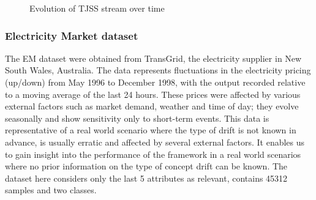 \documentclass[conference]{IEEEtran}
\begin{document}
\begin{figure}
\begin{center}
  \end{center}
  \caption{Evolution of TJSS stream over time}
\label{fig:syntheticstream} 
\end{figure}

\subsubsection{Electricity Market dataset}
The EM dataset were obtained from TransGrid, the electricity supplier in New South Wales, Australia. The data represents fluctuations in the electricity pricing (up/down) from May 1996 to December 1998, with the output recorded relative to a moving average of the last 24 hours. These prices were affected by various external factors such as market demand, weather and time of day; they evolve seasonally and show sensitivity only to short-term events. This data is representative of a real world scenario where the type of drift is not known in advance, is usually erratic and affected by several external factors. It enables us to gain insight into the performance of the framework in a real world scenarios where no prior information on the type of concept drift can be known. The dataset here considers only the last 5 attributes as relevant, contains 45312 samples and two classes. 
\end{document}
